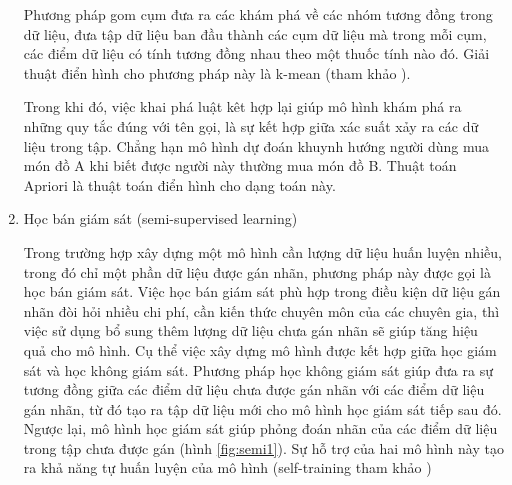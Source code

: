 \begin{enumerate}
          Phương pháp gom cụm đưa ra các khám phá về các nhóm tương đồng trong dữ liệu, đưa tập dữ liệu ban đầu thành các cụm dữ liệu mà trong mỗi cụm, các điểm dữ liệu có tính tương đồng nhau theo một thuốc tính nào đó. Giải thuật điển hình cho phương pháp này là k-mean (tham khảo \cite{tiep2018machine}).

          Trong khi đó, việc khai phá luật kêt hợp lại giúp mô hình khám phá ra những quy tắc đúng với tên gọi, là sự kết hợp giữa xác suất xảy ra các dữ liệu trong tập. Chẳng hạn mô hình dự đoán khuynh hướng người dùng mua món đồ A khi biết được người này thường mua món đồ B. Thuật toán Apriori là thuật toán điển hình cho dạng toán này.

    \item Học bán giám sát (semi-supervised learning)

          Trong trường hợp xây dựng một mô hình cần lượng dữ liệu huấn luyện nhiều, trong đó chỉ một phần dữ liệu được gán nhãn, phương pháp này được gọi là học bán giám sát. Việc học bán giám sát phù hợp trong điều kiện dữ liệu gán nhãn đòi hỏi nhiều chi phí, cần kiến thức chuyên môn của các chuyên gia, thì việc sử dụng bổ sung thêm lượng dữ liệu chưa gán nhãn sẽ giúp tăng hiệu quả cho mô hình. Cụ thể việc xây dựng mô hình được kết hợp giữa học giám sát và học không giám sát. Phương pháp học không giám sát giúp đưa ra sự tương đồng giữa các điểm dữ liệu chưa được gán nhãn với các điểm dữ liệu gán nhãn, từ đó tạo ra tập dữ liệu mới cho mô hình học giám sát tiếp sau đó. Ngược lại, mô hình học giám sát giúp phỏng đoán nhãn của các điểm dữ liệu trong tập chưa được gán (hình \ref{fig:semi1}). Sự hỗ trợ của hai mô hình này tạo ra khả năng tự huấn luyện của mô hình (self-training tham khảo \cite{zhu2009introduction})


\end{enumerate}
